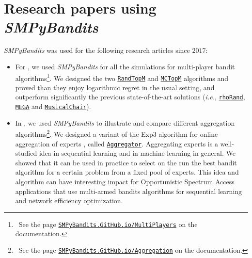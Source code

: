 \documentclass[a4paper,10pt,]{article}
\providecommand{\tightlist}{%
  \setlength{\itemsep}{0pt}\setlength{\parskip}{0pt}}
\begin{document}

\section{\texorpdfstring{Research papers using \emph{SMPyBandits}}{Research using SMPyBandits}}\label{research-using-smpybandits}

\emph{SMPyBandits} was used for the following research articles since
\(2017\):

\begin{itemize}
\tightlist
\item
  For \citet{BessonALT2018}, we used \emph{SMPyBandits} for all the
  simulations for multi-player bandit algorithms\footnote{~See
    the page
    \href{https://SMPyBandits.GitHub.io/MultiPlayers.html}{\texttt{SMPyBandits.GitHub.io/MultiPlayers}}
    on the documentation.}. We designed the two
  \href{https://SMPyBandits.GitHub.io/docs/PoliciesMultiPlayers.RandTopM.html}{\texttt{RandTopM}}
  and
  \href{https://SMPyBandits.GitHub.io/docs/PoliciesMultiPlayers.MCTopM.html}{\texttt{MCTopM}}
  algorithms and proved than they enjoy logarithmic regret in the usual
  setting, and outperform significantly the previous state-of-the-art
  solutions (\emph{i.e.},
  \href{https://SMPyBandits.GitHub.io/docs/PoliciesMultiPlayers.rhoRand.html}{\texttt{rhoRand}},
  \href{https://SMPyBandits.GitHub.io/docs/Policies.MEGA.html}{\texttt{MEGA}}
  and
  \href{https://SMPyBandits.GitHub.io/docs/Policies.MusicalChair.html}{\texttt{MusicalChair}}).
\end{itemize}

\begin{itemize}
\tightlist
\item
  In \citet{BessonWCNC2018}, we used \emph{SMPyBandits} to illustrate and
  compare different aggregation algorithms\footnote{~See the page
    \href{https://SMPyBandits.GitHub.io/Aggregation.html}{\texttt{SMPyBandits.GitHub.io/Aggregation}}
    on the documentation.}. We designed a variant of the Exp3 algorithm
  for online aggregation of experts \citep{Bubeck12}, called
  \href{https://SMPyBandits.GitHub.io/docs/Policies.Aggregator.html}{\texttt{Aggregator}}.
  Aggregating experts is a well-studied idea in sequential learning and
  in machine learning in general. We showed that it can be used in
  practice to select on the run the best bandit algorithm for a certain
  problem from a fixed pool of experts. This idea and algorithm can have
  interesting impact for Opportunistic Spectrum Access applications
  \citep{Jouini09} that use multi-armed bandits algorithms for sequential
  learning and network efficiency optimization.
\end{itemize}
\end{document}
